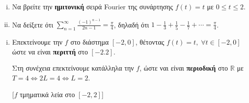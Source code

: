 \documentclass[a4paper,table]{report}
\begin{document}
\begin{mybox3}
  \begin{example}
  \item{}
  \item{}
    \begin{enumerate}[i)]
      \item Να βρείτε την \textbf{ημιτονική} σειρά \textlatin{Fourier} της συνάρτησης 
        $ f(t)=t $ με $ 0 \leq t \leq 2 $.
      \item Να δείξετε ότι $ \sum_{n=1}^{\infty} \frac{(-1)^{n-1}}{2n-1} = 
        \frac{\pi}{4} $, δηλαδή ότι $ 1 - \frac{1}{3} + \frac{1}{5} - \frac{1}{7}
        + \cdots = \frac{\pi}{4} $.
    \end{enumerate}
  \end{example}
\end{mybox3}
\begin{solution}
\item {}
  \begin{enumerate}[i)]
    \item 
      Επεκτείνουμε την $f$ στο διάστημα $ [-2,0] $, θέτοντας $ f(t)=t, \; 
      \forall t \in [-2,0] $ ώστε να είναι \textbf{περιττή} στο $ [-2.2] $.

      Στη συνέχεια επεκτείνουμε κατάλληλα την $f$, ώστε ναι είναι 
      \textbf{περιοδική} στο 
      $ \mathbb{R} $ με $ T=4 \Leftrightarrow 2L=4 \Leftrightarrow \boxed{L=2} $.

      \vspace{\baselineskip}
      \begin{minipage}[t]{0.58\textwidth}
        [$f$ τμηματικά λεία στο $[-2,2]$]
      \end{minipage}


\end{enumerate}
\end{solution}
\end{document}
